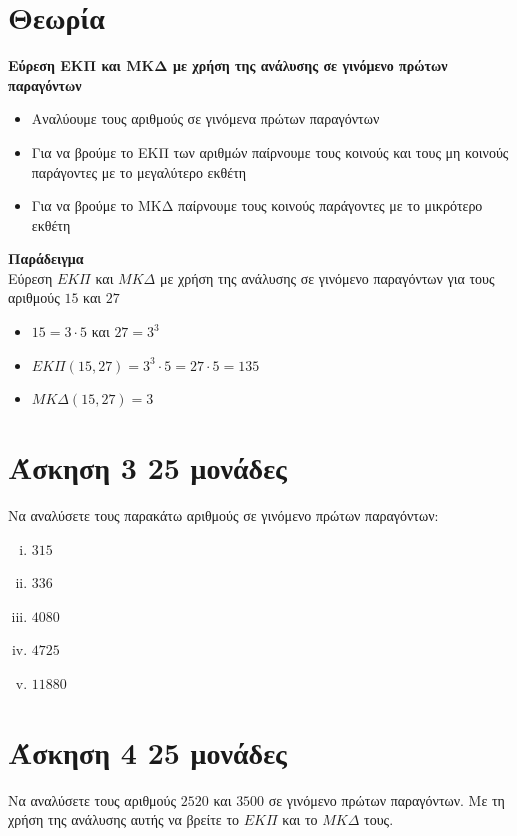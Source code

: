 \documentclass[a4paper,10pt]{report}
\begin{document}
\section*{Θεωρία  \hfill \small{}}
\textbf{Εύρεση ΕΚΠ και ΜΚΔ με χρήση της ανάλυσης σε γινόμενο πρώτων παραγόντων}
\begin{itemize}
 \item Αναλύουμε τους αριθμούς σε γινόμενα πρώτων παραγόντων
 \item Για να βρούμε το ΕΚΠ των αριθμών παίρνουμε τους κοινούς και τους μη κοινούς παράγοντες 
       με το μεγαλύτερο εκθέτη
 \item Για να βρούμε το ΜΚΔ παίρνουμε τους κοινούς παράγοντες με το μικρότερο εκθέτη
\end{itemize}
\textbf{Παράδειγμα}\\
Εύρεση $ΕΚΠ$ και $ΜΚΔ$ με χρήση της ανάλυσης σε γινόμενο παραγόντων για τους αριθμούς $15$ και $27$
\begin{itemize}
 \item $15=3\cdot 5$ και $27=3^{3}$
 \item $ΕΚΠ(15,27)=3^{3}\cdot 5=27\cdot 5=135$
 \item $ΜΚΔ(15,27)=3$
\end{itemize}




\section*{Άσκηση 3  \hfill \small{}25  μονάδες}
Να αναλύσετε τους παρακάτω αριθμούς σε γινόμενο πρώτων παραγόντων:
\begin{enumerate}[i)]
 \item $315$
 \item $336$
 \item $4080$
 \item $4725$
 \item $11880$
\end{enumerate}





\section*{Άσκηση 4  \hfill \small{} 25 μονάδες}
Να αναλύσετε τους αριθμούς $2520$ και $3500$ σε γινόμενο πρώτων παραγόντων. 
Με τη χρήση της ανάλυσης αυτής να βρείτε το $ΕΚΠ$ και το $ΜΚΔ$ τους.




\end{document}

